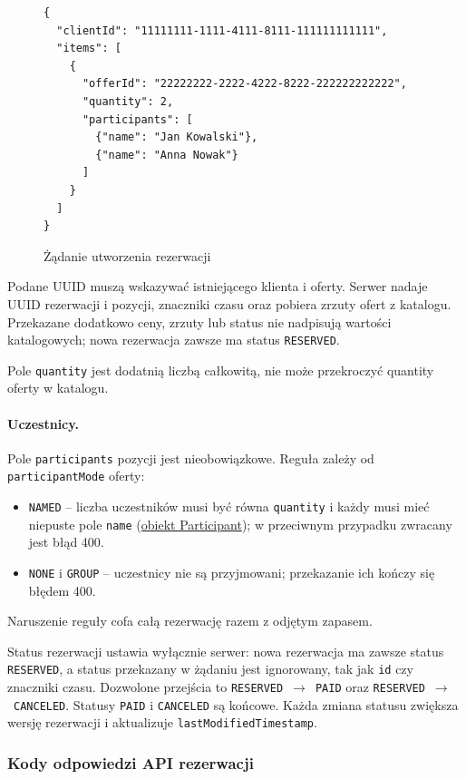 \begin{figure}[H]
\begin{verbatim}
{
  "clientId": "11111111-1111-4111-8111-111111111111",
  "items": [
    {
      "offerId": "22222222-2222-4222-8222-222222222222",
      "quantity": 2,
      "participants": [
        {"name": "Jan Kowalski"},
        {"name": "Anna Nowak"}
      ]
    }
  ]
}
\end{verbatim}
\caption{Żądanie utworzenia rezerwacji}
\label{schema:create-reservation-request}
\end{figure}

Podane UUID muszą wskazywać istniejącego klienta i oferty. Serwer nadaje UUID
rezerwacji i pozycji, znaczniki czasu oraz pobiera zrzuty ofert z katalogu.
Przekazane dodatkowo ceny, zrzuty lub status nie nadpisują wartości katalogowych; nowa rezerwacja zawsze ma status \texttt{RESERVED}.

Pole \texttt{quantity} jest dodatnią liczbą całkowitą, nie może przekroczyć quantity oferty w katalogu.

\paragraph{Uczestnicy.} Pole \texttt{participants} pozycji jest nieobowiązkowe.
Reguła zależy od \texttt{participantMode} oferty:
\begin{itemize}
  \item \texttt{NAMED} -- liczba uczestników musi być równa \texttt{quantity} i każdy musi mieć niepuste pole \texttt{name} (\hyperref[schema:participant]{obiekt Participant}); w przeciwnym przypadku zwracany jest błąd 400.
  \item \texttt{NONE} i \texttt{GROUP} -- uczestnicy nie są przyjmowani; przekazanie ich kończy się błędem 400.
\end{itemize}
Naruszenie reguły cofa całą rezerwację razem z odjętym zapasem.

Status rezerwacji ustawia wyłącznie serwer: nowa rezerwacja ma zawsze status \texttt{RESERVED}, a status przekazany w żądaniu jest ignorowany, tak jak \texttt{id} czy znaczniki czasu.
Dozwolone przejścia to
\texttt{RESERVED}~$\rightarrow$~\texttt{PAID} oraz
\texttt{RESERVED}~$\rightarrow$~\texttt{CANCELED}.
Statusy \texttt{PAID} i \texttt{CANCELED} są końcowe.
Każda zmiana statusu zwiększa wersję rezerwacji i aktualizuje \texttt{lastModifiedTimestamp}.

\subsubsection{Kody odpowiedzi API rezerwacji}

